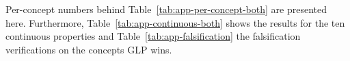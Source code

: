 \documentclass{article}
\begin{document}
Per-concept numbers behind Table~\ref{tab:app-per-concept-both} are presented here. Furthermore,
Table~\ref{tab:app-continuous-both} shows the results for the ten continuous properties and
Table~\ref{tab:app-falsification} the falsification verifications on the concepts GLP wins.




\end{document}
